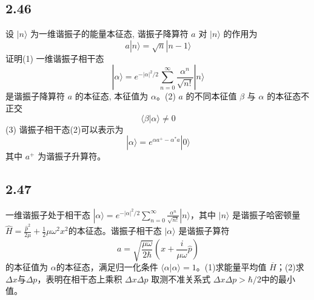 \subsection{2.46}
设 $|n\rangle$ 为一维谐振子的能量本征态, 谐振子降算符 $a$ 对 $|n\rangle$ 的作用为
$$a|n\rangle = \sqrt{n}|n-1\rangle$$
证明(1) 一维谐振子相干态
$$|\alpha\rangle = e^{-|\alpha|^2/2} \sum_{n=0}^{\infty} \frac{\alpha^n}{\sqrt{n!}} |n\rangle$$
是谐振子降算符 $a$ 的本征态, 本征值为 $\alpha$。(2) $a$ 的不同本征值 $\beta$ 与 $\alpha$ 的本征态不正交
$$\langle \beta | \alpha \rangle \neq 0$$
(3) 谐振子相干态(2)可以表示为
$$|\alpha\rangle = e^{\alpha a^+ - \alpha^* a} |0\rangle$$
其中 $a^+$ 为谐振子升算符。

\subsection{2.47}
一维谐振子处于相干态 $|\alpha\rangle = e^{-|\alpha|^2/2} \sum_{n=0}^{\infty} \frac{\alpha^n}{\sqrt{n!}} |n\rangle$，其中 $|n\rangle$ 是谐振子哈密顿量 $\hat{H} = \frac{\hat{p}^2}{2\mu} + \frac{1}{2}\mu\omega^2 x^2$的本征态。谐振子相干态 $|\alpha\rangle$ 是谐振子算符
$$a = \sqrt{\frac{\mu\omega}{2\hbar}} \left( x + \frac{i}{\mu\omega} \hat{p} \right)$$
的本征值为 $\alpha$的本征态，满足归一化条件 $\langle \alpha | \alpha \rangle = 1$。(1)求能量平均值 $\overline{H}$；(2)求 $\Delta x$与$\Delta p$，表明在相干态上乘积 $\Delta x \Delta p$ 取测不准关系式 $\Delta x \Delta p > \hbar/2$中的最小值。
